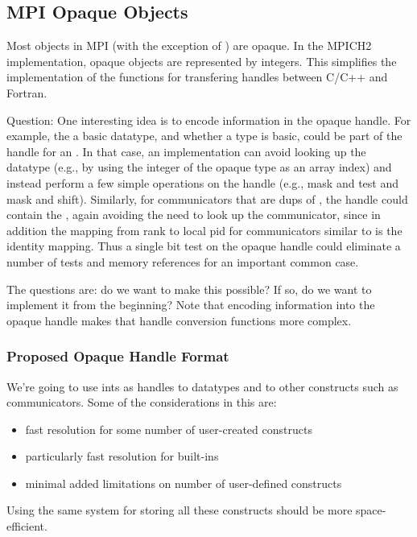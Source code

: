 \documentclass{article}
\begin{document}
\subsection{MPI Opaque Objects}

Most objects in MPI (with the exception of ) are
opaque.  In the MPICH2 implementation, opaque objects are represented
by integers.  This simplifies the implementation of the functions for
transfering handles between C/C++ and Fortran.  

Question:  One interesting idea is to encode information in the opaque
handle.  For example, the  a basic datatype, and whether
a type is basic, could be part of the handle for an
. In that case, an implementation can avoid looking
up the datatype (e.g., by using the integer of the opaque type as an
array index) and instead perform a few simple operations on the handle
(e.g., mask and test and mask and shift).  Similarly, for
communicators that are dups of , the handle could
contain the , again avoiding the need to look up the
communicator, since in addition the mapping from rank to local pid for 
communicators similar to  is the identity
mapping.  Thus a single bit test on the opaque handle could eliminate
a number of tests and memory references for an important common case.

The questions are: do we want to make this possible?  If so, do we
want to implement it from the beginning?  Note that encoding
information into the opaque handle makes that handle conversion
functions more complex.

\subsubsection{Proposed Opaque Handle Format}

We're going to use ints as handles to datatypes and to other constructs such
as communicators.  Some of the considerations in this are:
\begin{itemize}
\item fast resolution for some number of user-created constructs
\item particularly fast resolution for built-ins
\item minimal added limitations on number of user-defined constructs 
\end{itemize}

Using the same system for storing all these constructs should be more
space-efficient.
\end{document}
